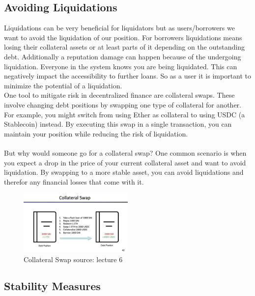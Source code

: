 \documentclass{article}
\begin{document}
\subsection{Avoiding Liquidations}
Liquidations can be very beneficial for liquidators but as users/borrowers we want to avoid the liquidation of our position. For borrowers liquidations means losing their collateral assets or at least parts of it depending on the outstanding debt. Additionally a reputation damage can happen because of the undergoing liquidation. Everyone in the system knows you are being liquidated. This can negatively impact the accessibility to further loans. So as a user it is important to minimize the potential of a liquidation.\\
One tool to mitigate risk in decentralized finance are collateral swaps. These involve changing debt positions by swapping one type of collateral for another. For example, you might switch from using Ether as collateral to using USDC (a Stablecoin) instead. By executing this swap in a single transaction, you can maintain your position while reducing the risk of liquidation.\\\\But why would someone go for a collateral swap? One common scenario is when you expect a drop in the price of your current collateral asset and want to avoid liquidation. By swapping to a more stable asset, you can avoid liquidations and therefor any financial losses that come with it.\\
\begin{figure}[h]
    \centering
    \includegraphics[width=0.5\textwidth]{Bildschirmfoto 2024-04-07 um 17.48.13.png} 
    \caption{Collateral Swap \scriptsize{source: lecture 6}}
    \label{fig:DoS-attack}
\end{figure}

\subsection{Stability Measures}%
\end{document}
